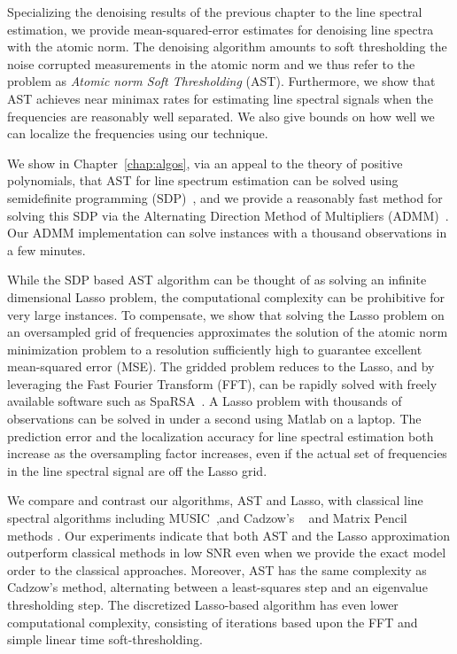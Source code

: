 Specializing the denoising results of the previous chapter to the line spectral
estimation, we provide mean-squared-error estimates for denoising line spectra
with the atomic norm. The denoising algorithm amounts to soft thresholding the
noise corrupted measurements in the atomic norm and we thus refer to the problem
as \emph{Atomic norm Soft Thresholding} (AST). Furthermore, we show that AST achieves near minimax rates for estimating line spectral signals when the frequencies are reasonably well separated. We also give bounds on how well we can localize the frequencies using our technique.

We show in Chapter~\ref{chap:algos}, via an appeal to the theory of positive
polynomials, that AST for line spectrum estimation can be solved using
semidefinite programming (SDP)~\cite{Megretski03}, and we provide a reasonably
fast method for solving this SDP via the Alternating Direction Method of
Multipliers (ADMM)~\cite{BertsekasParallelBook,admm2011}. Our ADMM
implementation can solve instances with a thousand observations in a few
minutes. 

While the SDP based AST algorithm can be thought of as solving an infinite
dimensional Lasso problem, the computational complexity can be prohibitive for
very large instances. To compensate, we show that solving the Lasso problem on
an oversampled grid of frequencies approximates the solution of the atomic norm
minimization problem to a resolution sufficiently high to guarantee excellent
mean-squared error (MSE). The gridded problem reduces to the Lasso, and by
leveraging the Fast Fourier Transform (FFT), can be rapidly solved with freely
available software such as SpaRSA~\cite{wright09}. A Lasso problem with
thousands of observations can be solved in under a second using Matlab on a
laptop. The prediction error and the localization accuracy for line spectral
estimation both increase as the oversampling factor increases, even if the
actual set of frequencies in the line spectral signal are off the Lasso grid.

We compare and contrast our algorithms, AST and Lasso, with classical line
spectral algorithms including MUSIC~\cite{music},and Cadzow's ~\cite{cadzow02}
and Matrix Pencil~\cite{hua02} methods . Our experiments indicate that both AST
and the Lasso approximation outperform classical methods in low SNR even when we
provide the exact model order to the classical approaches. Moreover, AST has the
same complexity as Cadzow's method, alternating between a least-squares step and
an eigenvalue thresholding step. The discretized Lasso-based algorithm has even
lower computational complexity, consisting of iterations based upon the FFT and
simple linear time soft-thresholding.

